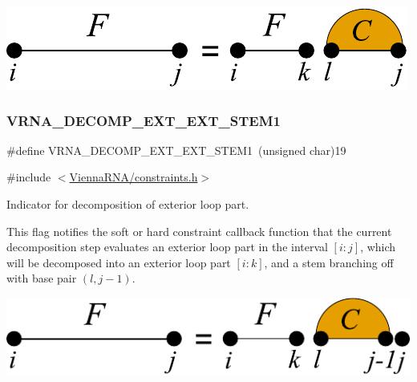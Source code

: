  
\begin{DoxyImageNoCaption}
  \mbox{\includegraphics[width=\textwidth,height=\textheight/2,keepaspectratio=true]{decomp_ext_ext_stem}}
\end{DoxyImageNoCaption}
 \mbox{\label{group__constraints_ga2e75d7a77118735b32f25422d9686719}} 
\subsubsection{\texorpdfstring{V\+R\+N\+A\+\_\+\+D\+E\+C\+O\+M\+P\+\_\+\+E\+X\+T\+\_\+\+E\+X\+T\+\_\+\+S\+T\+E\+M1}{VRNA\_DECOMP\_EXT\_EXT\_STEM1}}
{\footnotesize\ttfamily \#define V\+R\+N\+A\+\_\+\+D\+E\+C\+O\+M\+P\+\_\+\+E\+X\+T\+\_\+\+E\+X\+T\+\_\+\+S\+T\+E\+M1~(unsigned char)19}



{\ttfamily \#include $<$\hyperlink{constraints_8h}{Vienna\+R\+N\+A/constraints.\+h}$>$}



Indicator for decomposition of exterior loop part. 

This flag notifies the soft or hard constraint callback function that the current decomposition step evaluates an exterior loop part in the interval $[i:j]$, which will be decomposed into an exterior loop part $[i:k]$, and a stem branching off with base pair $(l,j-1)$.

 
\begin{DoxyImageNoCaption}
  \mbox{\includegraphics[width=\textwidth,height=\textheight/2,keepaspectratio=true]{decomp_ext_ext_stem1}}
\end{DoxyImageNoCaption}
 

